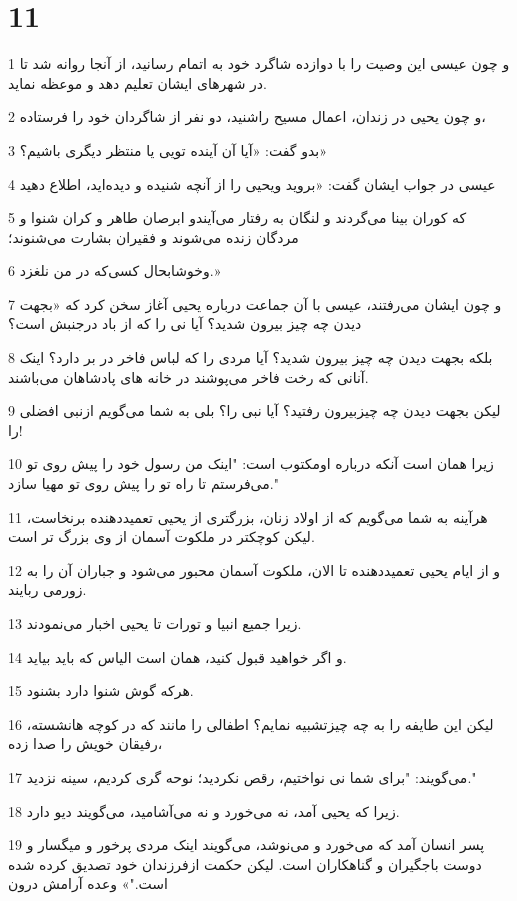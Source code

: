 \chapter{11}

\par 1 و چون عیسی این وصیت را با دوازده شاگرد خود به اتمام رسانید، از آنجا روانه شد تا در شهرهای ایشان تعلیم دهد و موعظه نماید.
\par 2 و چون یحیی در زندان، اعمال مسیح راشنید، دو نفر از شاگردان خود را فرستاده،
\par 3 بدو گفت: «آیا آن آینده تویی یا منتظر دیگری باشیم؟»
\par 4 عیسی در جواب ایشان گفت: «بروید ویحیی را از آنچه شنیده و دیده‌اید، اطلاع دهید
\par 5 که کوران بینا می‌گردند و لنگان به رفتار می‌آیندو ابرصان طاهر و کران شنوا و مردگان زنده می‌شوند و فقیران بشارت می‌شنوند؛
\par 6 وخوشابحال کسی‌که در من نلغزد.»
\par 7 و چون ایشان می‌رفتند، عیسی با آن جماعت درباره یحیی آغاز سخن کرد که «بجهت دیدن چه چیز بیرون شدید؟ آیا نی را که از باد درجنبش است؟
\par 8 بلکه بجهت دیدن چه چیز بیرون شدید؟ آیا مردی را که لباس فاخر در بر دارد؟ اینک آنانی که رخت فاخر می‌پوشند در خانه های پادشاهان می‌باشند.
\par 9 لیکن بجهت دیدن چه چیزبیرون رفتید؟ آیا نبی را؟ بلی به شما می‌گویم ازنبی افضلی را!
\par 10 زیرا همان است آنکه درباره اومکتوب است: "اینک من رسول خود را پیش روی تو می‌فرستم تا راه تو را پیش روی تو مهیا سازد."
\par 11 هرآینه به شما می‌گویم که از اولاد زنان، بزرگتری از یحیی تعمید‌دهنده برنخاست، لیکن کوچکتر در ملکوت آسمان از وی بزرگ تر است.
\par 12 و از ایام یحیی تعمید‌دهنده تا الان، ملکوت آسمان محبور می‌شود و جباران آن را به زورمی ربایند.
\par 13 زیرا جمیع انبیا و تورات تا یحیی اخبار می‌نمودند.
\par 14 و اگر خواهید قبول کنید، همان است الیاس که باید بیاید.
\par 15 هر‌که گوش شنوا دارد بشنود.
\par 16 لیکن این طایفه را به چه چیزتشبیه نمایم؟ اطفالی را مانند که در کوچه هانشسته، رفیقان خویش را صدا زده،
\par 17 می‌گویند: "برای شما نی نواختیم، رقص نکردید؛ نوحه گری کردیم، سینه نزدید."
\par 18 زیرا که یحیی آمد، نه می‌خورد و نه می‌آشامید، می‌گویند دیو دارد.
\par 19 پسر انسان آمد که می‌خورد و می‌نوشد، می‌گویند اینک مردی پرخور و میگسار و دوست باجگیران و گناهکاران است. لیکن حکمت ازفرزندان خود تصدیق کرده شده است."» وعده آرامش درون
